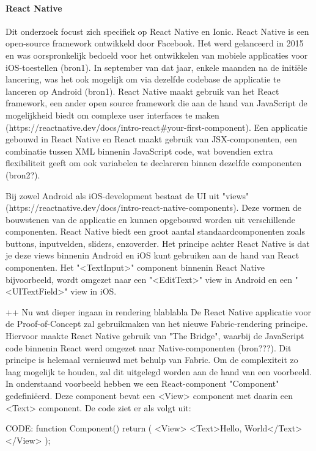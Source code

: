 \paragraph{React Native}

Dit onderzoek focust zich specifiek op React Native en Ionic. React Native is een open-source framework ontwikkeld door Facebook. Het werd gelanceerd in 2015 en was oorspronkelijk bedoeld voor het ontwikkelen van mobiele applicaties voor iOS-toestellen (bron1). In september van dat jaar, enkele maanden na de initiële lancering, was het ook mogelijk om via dezelfde codebase de applicatie te lanceren op Android (bron1). React Native maakt gebruik van het React framework, een ander open source framework die aan de hand van JavaScript de mogelijkheid biedt om complexe user interfaces te maken (https://reactnative.dev/docs/intro-react#your-first-component). Een applicatie gebouwd in React Native en React maakt gebruik van JSX-componenten, een combinatie tussen XML binnenin JavaScript code, wat bovendien extra flexibiliteit geeft om ook variabelen te declareren binnen dezelfde componenten (bron2?).

Bij zowel Android als iOS-development bestaat de UI uit "views" (https://reactnative.dev/docs/intro-react-native-components). Deze vormen de bouwstenen van de applicatie en kunnen opgebouwd worden uit verschillende componenten. React Native biedt een groot aantal standaardcomponenten zoals buttons, inputvelden, sliders, enzoverder. Het principe achter React Native is dat je deze views binnenin Android en iOS kunt gebruiken aan de hand van React componenten. Het "<TextInput>" component binnenin React Native bijvoorbeeld, wordt omgezet naar een "<EditText>" view in Android en een "<UITextField>" view in iOS.


++ Nu wat dieper ingaan in rendering blablabla
De React Native applicatie voor de Proof-of-Concept zal gebruikmaken van het nieuwe Fabric-rendering principe. Hiervoor maakte React Native gebruik van "The Bridge", waarbij de JavaScript code binnenin React werd omgezet naar Native-componenten (bron???). Dit principe is helemaal vernieuwd met behulp van Fabric. Om de complexiteit zo laag mogelijk te houden, zal dit uitgelegd worden aan de hand van een voorbeeld. In onderstaand voorbeeld hebben we een React-component "Component" gedefiniëerd. Deze component bevat een <View> component met daarin een <Text> component. De code ziet er als volgt uit:

CODE: function Component() {
  return (
    <View>
      <Text>Hello, World</Text>
    </View>
  );
}

